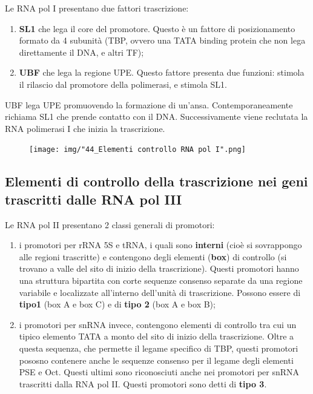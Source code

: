 \documentclass[11pt]{book}
\begin{document}
Le RNA pol I presentano due fattori trascrizione:

\begin{enumerate}
\def\labelenumi{\arabic{enumi}.}
\itemsep1pt\parskip0pt
\item
  \textbf{SL1} che lega il core del promotore. Questo è un fattore di
  posizionamento formato da 4 subunità (TBP, ovvero una TATA binding
  protein che non lega direttamente il DNA, e altri TF);
\item
  \textbf{UBF} che lega la regione UPE. Questo fattore presenta due
  funzioni: stimola il rilascio dal promotore della polimerasi, e
  stimola SL1.
\end{enumerate}

UBF lega UPE promuovendo la formazione di un'ansa. Contemporaneamente
richiama SL1 che prende contatto con il DNA. Successivamente viene
reclutata la RNA polimerasi I che inizia la trascrizione.

\begin{figure}[htp]
\centering
\texttt{[image: img/"44\_Elementi controllo RNA pol I".png]}
\caption{}
\label{elementi-controllo-rna-pol-i}
\end{figure}

\subsection{Elementi di controllo della trascrizione nei geni
trascritti dalle RNA pol
III}\label{elementi-di-controllo-della-trascrizione-nei-geni-trascritti-dalle-rna-pol-iii}

Le RNA pol II presentano 2 classi generali di promotori:

\begin{enumerate}
\def\labelenumi{\arabic{enumi}.}
\itemsep1pt\parskip0pt
\item
  i promotori per rRNA 5S e tRNA, i quali sono \textbf{interni} (cioè si
  sovrappongo alle regioni trascritte) e contengono degli elementi
  (\textbf{box}) di controllo (si trovano a valle del sito di inizio
  della trascrizione). Questi promotori hanno una struttura bipartita
  con corte sequenze consenso separate da una regione variabile e
  localizzate all'interno dell'unità di trascrizione. Possono essere di
  \textbf{tipo1} (box A e box C) e di \textbf{tipo 2} (box A e box B);
\item
  i promotori per snRNA invece, contengono elementi di controllo tra cui
  un tipico elemento TATA a monto del sito di inizio della trascrizione.
  Oltre a questa sequenza, che permette il legame specifico di TBP,
  questi promotori pososno contenere anche le sequenze consenso per il
  legame degli elementi PSE e Oct. Questi ultimi sono riconosciuti anche
  nei promotori per snRNA trascritti dalla RNA pol II. Questi promotori
  sono detti di \textbf{tipo 3}.
\end{enumerate}
\end{document}
